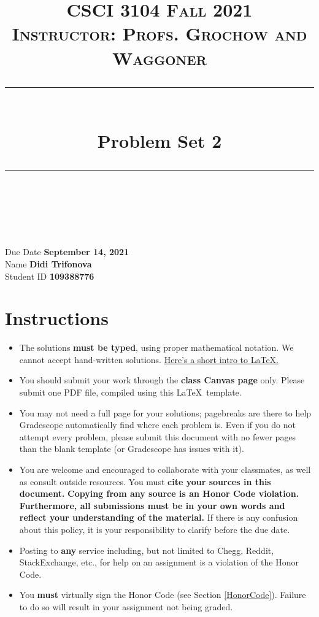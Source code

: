 \documentclass[11pt]{article}
\title{
\normalfont \normalsize 
\textsc{CSCI 3104 Fall 2021 \\ 
Instructor: Profs. Grochow and Waggoner} \\
[10pt] 
\rule{\linewidth}{0.5pt} \\[6pt] 
\huge Problem Set 2 \\
\rule{\linewidth}{2pt}  \\[10pt]
}
\date{}
\theoremstyle{definition}
\theoremstyle{definition}
\theoremstyle{definition}
\begin{document}

\maketitle


\noindent
Due Date \dotfill \textbf{September 14, 2021} \\
Name \dotfill \textbf{Didi Trifonova} \\
Student ID \dotfill \textbf{109388776} \\

\tableofcontents

\section{Instructions}
 \begin{itemize}
	\item The solutions \textbf{must be typed}, using proper mathematical notation. We cannot accept hand-written solutions. \href{http://ece.uprm.edu/~caceros/latex/introduction.pdf}{Here's a short intro to \LaTeX.}
	\item You should submit your work through the \textbf{class Canvas page} only. Please submit one PDF file, compiled using this \LaTeX \ template.
	\item You may not need a full page for your solutions; pagebreaks are there to help Gradescope automatically find where each problem is. Even if you do not attempt every problem, please submit this document with no fewer pages than the blank template (or Gradescope has issues with it).

	\item You are welcome and encouraged to collaborate with your classmates, as well as consult outside resources. You must \textbf{cite your sources in this document.} \textbf{Copying from any source is an Honor Code violation. Furthermore, all submissions must be in your own words and reflect your understanding of the material.} If there is any confusion about this policy, it is your responsibility to clarify before the due date. 

	\item Posting to \textbf{any} service including, but not limited to Chegg, Reddit, StackExchange, etc., for help on an assignment is a violation of the Honor Code.

	\item You \textbf{must} virtually sign the Honor Code (see Section \ref{HonorCode}). Failure to do so will result in your assignment not being graded.
\end{itemize}
\end{document}
